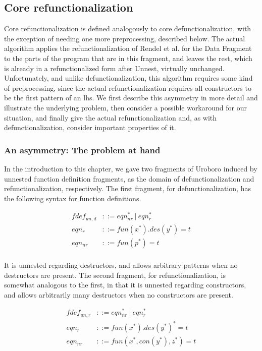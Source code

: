 \subsection{Core refunctionalization}

Core refunctionalization is defined analogously to core defunctionalization, with the exception of needing one more preprocessing, described below. The actual algorithm applies the refunctionalization of Rendel et al. for the Data Fragment to the parts of the program that are in this fragment, and leaves the rest, which is already in a refunctionalized form after \textsf{Unnest}, virtually unchanged. Unfortunately, and unlike defunctionalization, this algorithm requires some kind of preprocessing, since the actual refunctionalization requires all constructors to be the first pattern of an lhs. We first describe this asymmetry in more detail and illustrate the underlying problem, then consider a possible workaround for our situation, and finally give the actual refunctionalization and, as with defunctionalization, consider important properties of it.

\subsubsection{An asymmetry: The problem at hand}
\label{sssec:asym}

In the introduction to this chapter, we gave two fragments of Uroboro induced by unnested function definition fragments, as the domain of defunctionalization and refunctionalization, respectively. The first fragment, for defunctionalization, has the following syntax for function definitions.

\begin{align*}
fdef_{un,d} &::= eqn_{nr}^* ~ | ~ eqn_r^* \\
eqn_r &::= fun(x^*).des(y^*) = t \\
eqn_{nr} &::= fun(p^*) = t \\
\end{align*}

It is unnested regarding destructors, and allows arbitrary patterns when no destructors are present. The second fragment, for refunctionalization, is somewhat analogous to the first, in that it is unnested regarding constructors, and allows arbitrarily many destructors when no constructors are present.

\begin{align*}
fdef_{un,r} &::= eqn_{nr}^* ~ | ~ eqn_r^* \\
eqn_r &::= fun(x^*).des(y^*)^* = t \\
eqn_{nr} &::= fun(x^*, con(y^*), z^*) = t \\
\end{align*}

